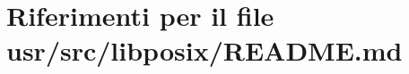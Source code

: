 \hypertarget{usr_2src_2libposix_2README_8md}{\section{Riferimenti per il file usr/src/libposix/\+R\+E\+A\+D\+M\+E.md}
\label{usr_2src_2libposix_2README_8md}
}
